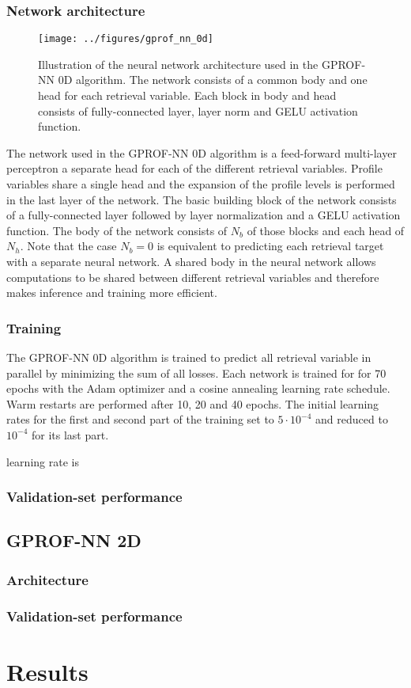 \documentclass[a4paper,11pt,bibtotoc]{scrartcl}
\begin{document}
\subsubsection{Network architecture}

\begin{figure}[hbpt]
  \centering
    \texttt{[image: ../figures/gprof\_nn\_0d]}
    \caption{Illustration of the neural network architecture used in the
      GPROF-NN 0D algorithm. The network consists of a common body and
      one head for each retrieval variable. Each block in body and head
      consists of fully-connected layer, layer norm and GELU activation function.
    }
  \label{fig:gprof_nn_0d}
\end{figure}

The network used in the GPROF-NN 0D algorithm is a feed-forward multi-layer
perceptron a  separate head for each of the different retrieval variables.
Profile variables share a single head and the expansion of the profile levels
is performed in the last layer of the network. The basic building block of
the network consists of a fully-connected layer followed by layer normalization
and a GELU activation function. The body of the network consists of
$N_b$ of those blocks and each head of $N_h$. Note that the case $N_b = 0$ is
equivalent to predicting each retrieval target with a separate neural network.
A shared body in the neural network allows computations to be shared between
different retrieval variables and therefore makes inference and training more
efficient.

\subsubsection{Training}

The GPROF-NN 0D algorithm is trained to predict all retrieval variable in
parallel by minimizing the sum of all losses. Each network is trained for
for 70 epochs with the Adam optimizer and a cosine annealing learning rate
schedule. Warm restarts are performed after 10, 20 and 40 epochs. The initial
learning rates for the first and second part of the training set to $5\cdot 10^{-4}$
and reduced to $10^{-4}$ for its last part.

learning rate is 

\subsubsection{Validation-set performance}

\subsection{GPROF-NN 2D}

\subsubsection{Architecture}


\subsubsection{Validation-set performance}


\section{Results}



\end{document}

